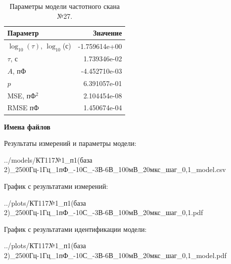 \begin{table}[!ht]
    \centering
    \caption{Параметры модели частотного скана №27.}
    \begin{tabular}{|l|r|}
        \hline
        Параметр                                       & Значение                  \\ \hline
        $\log_{10}(\tau)$, $\log_{10}$(с)              & -1.759614e+00             \\ \hline
        $\tau$, с                                      & 1.739346e-02              \\ \hline
        $A$, пФ                                        & -4.452710e-03             \\ \hline
        $p$                                            & 6.391057e-01              \\ \hline
        MSE, пФ$^2$                                    & 2.104454e-08              \\ \hline
        RMSE пФ                                        & 1.450674e-04              \\ \hline
    \end{tabular}
    \label{table:frequency_scan_model_27}
\end{table}

\textbf{Имена файлов}

Результаты измерений и параметры модели:

\scriptsize../models/КТ117№1\_п1(база 2)\_2500Гц-1Гц\_1пФ\_-10С\_-3В-6В\_100мВ\_20мкс\_шаг\_0,1\_model.csv
\normalsize

График с результатами измерений:

\scriptsize../plots/КТ117№1\_п1(база 2)\_2500Гц-1Гц\_1пФ\_-10С\_-3В-6В\_100мВ\_20мкс\_шаг\_0,1.pdf
\normalsize

График с результатами идентификации модели:

\scriptsize../plots/КТ117№1\_п1(база 2)\_2500Гц-1Гц\_1пФ\_-10С\_-3В-6В\_100мВ\_20мкс\_шаг\_0,1\_model.pdf
\normalsize

